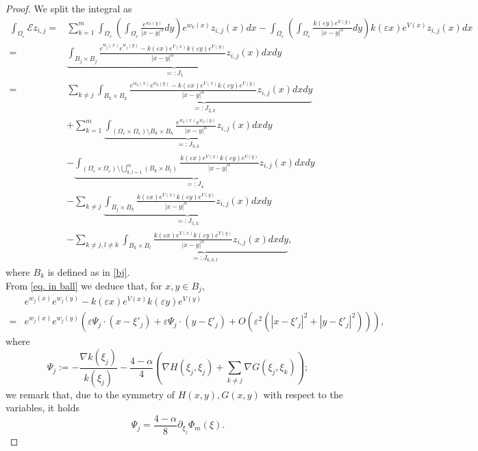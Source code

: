 \documentclass[11pt]{article}
\begin{document}
\begin{proof}
We split the integral as
\begin{align*}
\int_{\Omega_\varepsilon}\mathcal Ez_{i,j}=&\sum_{k=1}^m\int_{\Omega_\varepsilon}\left(\int_{\Omega_\varepsilon}\frac{e^{w_k(y)}}{|x-y|^\alpha}dy\right)e^{w_k(x)}z_{i,j}(x)dx-\int_{\Omega_\varepsilon}\left(\int_{\Omega_\varepsilon}\frac{k(\varepsilon y)e^{V(y)}}{|x-y|^\alpha}dy\right)k(\varepsilon x)e^{V(x)}z_{i,j}(x)dx\\
=&\underbrace{\int_{B_j\times B_j}\frac{e^{w_j(x)}e^{w_j(y)}-k(\varepsilon x)e^{V(x)}k(\varepsilon y)e^{V(y)}}{|x-y|^\alpha}z_{i,j}(x)dxdy}_{=:J_1}\\
=&\sum_{k\ne j}\underbrace{\int_{B_k\times B_k}\frac{e^{w_k(x)}e^{w_k(y)}-k(\varepsilon x)e^{V(x)}k(\varepsilon y)e^{V(y)}}{|x-y|^\alpha}z_{i,j}(x)dxdy}_{=:J_{2,k}}\\
&+\sum_{k=1}^m\underbrace{\int_{(\Omega_\varepsilon\times\Omega_\varepsilon)\setminus B_k\times B_k}\frac{e^{w_k(x)}e^{w_k(y)}}{|x-y|^\alpha}z_{i,j}(x)dxdy}_{=:J_{3,k}}\\
&-\underbrace{\int_{(\Omega_\varepsilon\times\Omega_\varepsilon)\setminus\bigcup_{k,l=1}^m(B_k\times B_l)}\frac{k(\varepsilon x)e^{V(x)}k(\varepsilon y)e^{V(y)}}{|x-y|^\alpha}z_{i,j}(x)dxdy}_{=:J_4}\\
&-\sum_{k\ne j}\underbrace{\int_{B_j\times B_k}\frac{k(\varepsilon x)e^{V(x)}k(\varepsilon y)e^{V(y)}}{|x-y|^\alpha}z_{i,j}(x)dxdy}_{=:J_{5,k}}\\
&-\sum_{k\ne j,l\ne k}\underbrace{\int_{B_k\times B_l}\frac{k(\varepsilon x)e^{V(x)}k(\varepsilon y)e^{V(y)}}{|x-y|^\alpha}z_{i,j}(x)dxdy}_{=:J_{6,k,l}},	
\end{align*}
where $B_k$ is defined as in \eqref{bj}.\\
From \eqref{eq. in ball} we deduce that, for $x,y\in B_j$,
\begin{align*}
&e^{w_j(x)}e^{w_j(y)}-k(\varepsilon x)e^{V(x)}k(\varepsilon y)e^{V(y)}\\
=&e^{w_j(x)}e^{w_j(y)}\left(\varepsilon\Psi_j\cdot\left(x-\xi'_j\right)+\varepsilon\Psi_j\cdot\left(y-\xi'_j\right)+O\left(\varepsilon^2\left(\left|x-\xi'_j\right|^2+\left|y-\xi'_j\right|^2\right)\right)\right),
\end{align*}
where
$$\Psi_j:=-\frac{\nabla k(\xi_j)}{k\left(\xi_j\right)}-\frac{4-\alpha}4\left(\nabla H(\xi_j,\xi_j)+\sum_{k\ne j}\nabla G(\xi_j,\xi_k)\right);$$
we remark that, due to the symmetry of $H(x,y),G(x,y)$ with respect to the variables, it holds
$$\Psi_j=\frac{4-\alpha}8\partial_{\xi_j}\Phi_m(\xi).$$

\end{proof}
\end{document}
